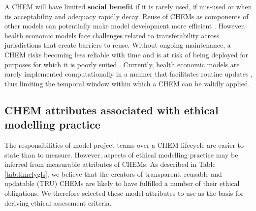 \documentclass[sn-vancouver,Numbered,pdflatex]{sn-jnl}
\theoremstyle{remark}
\theoremstyle{definition}
\begin{document}
A CHEM will have limited \textbf{social benefit} if it is rarely used, if mis-used or when its acceptability and adequacy rapidly decay. Reuse of CHEMs as components of other models can potentially make model development more efficient \citep{Arnold2010, garcia2021cost}. However, health economic models face challenges related to transferability across jurisdictions \citep{garcia2021cost} that create barriers to reuse. Without ongoing maintenance, a CHEM risks becoming less reliable with time \citep{garcia2021cost} and is at risk of being deployed for purposes for which it is poorly suited \citep{calder2018computational}. Currently, health economic models are rarely implemented computationally in a manner that facilitates routine updates \citep{Sampson2017}, thus limiting the temporal window within which a CHEM can be validly applied.

\hypertarget{chem-attributes-associated-with-ethical-modelling-practice}{%
\subsection{CHEM attributes associated with ethical modelling practice}\label{chem-attributes-associated-with-ethical-modelling-practice}}

The responsibilities of model project teams over a CHEM lifecycle are easier to state than to measure. However, aspects of ethical modelling practice may be inferred from measurable attributes of CHEMs. As described in Table \ref{tab:timelygls}, we believe that the creators of transparent, reusable and updatable (TRU) CHEMs are likely to have fulfilled a number of their ethical obligations. We therefore selected these model attributes to use as the basis for deriving ethical assessment criteria.
\end{document}
